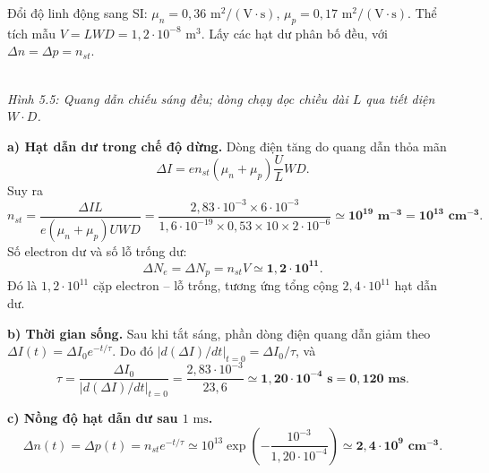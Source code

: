 \documentclass[11pt,a4paper]{article}
\renewcommand{\boldsymbol}[1]{\symbf{#1}}
\begin{document}
Đổi độ linh động sang SI: $\mu_n=0{,}36\text{ m}^2/(\text{V}\cdot\text{s})$,
$\mu_p=0{,}17\text{ m}^2/(\text{V}\cdot\text{s})$.
Thể tích mẫu $V=LWD=1{,}2\cdot10^{-8}\text{ m}^3$.
Lấy các hạt dư phân bố đều, với $\Delta n=\Delta p=n_{st}$.

\begin{center}\begin{minipage}{\linewidth}\centering
{}\\[0.1cm]
\textit{Hình 5.5: Quang dẫn chiếu sáng đều; dòng chạy dọc chiều dài $L$ qua tiết diện $W\cdot D$.}
\end{minipage}\end{center}

\textbf{a) Hạt dẫn dư trong chế độ dừng.}
Dòng điện tăng do quang dẫn thỏa mãn
\[
\Delta I=e n_{st}(\mu_n+\mu_p)\frac{U}{L}WD.
\]
Suy ra
\[
n_{st}=\frac{\Delta I L}{e(\mu_n+\mu_p)UWD}
=\frac{2{,}83\cdot10^{-3}\times6\cdot10^{-3}}
{1{,}6\cdot10^{-19}\times0{,}53\times10\times2\cdot10^{-6}}
\simeq\boldsymbol{10^{19}\text{ m}^{-3}=10^{13}\text{ cm}^{-3}}.
\]
Số electron dư và số lỗ trống dư:
\[
\Delta N_e=\Delta N_p=n_{st}V\simeq\boldsymbol{1{,}2\cdot10^{11}}.
\]
Đó là $1{,}2\cdot10^{11}$ cặp electron -- lỗ trống,
tương ứng tổng cộng $2{,}4\cdot10^{11}$ hạt dẫn dư.

\textbf{b) Thời gian sống.}
Sau khi tắt sáng, phần dòng điện quang dẫn giảm theo
$\Delta I(t)=\Delta I_0e^{-t/\tau}$.
Do đó $|d(\Delta I)/dt|_{t=0}=\Delta I_0/\tau$, và
\[
\tau=\frac{\Delta I_0}{|d(\Delta I)/dt|_{t=0}}
=\frac{2{,}83\cdot10^{-3}}{23{,}6}
\simeq\boldsymbol{1{,}20\cdot10^{-4}\text{ s}=0{,}120\text{ ms}}.
\]

\textbf{c) Nồng độ hạt dẫn dư sau $1\text{ ms}$.}
\[
\Delta n(t)=\Delta p(t)=n_{st}e^{-t/\tau}
\simeq10^{13}\exp\left(-\frac{10^{-3}}{1{,}20\cdot10^{-4}}\right)
\simeq\boldsymbol{2{,}4\cdot10^9\text{ cm}^{-3}}.
\]

\vspace{0.45cm}
\end{document}
